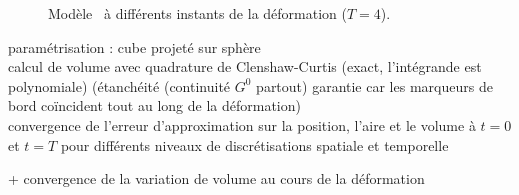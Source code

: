 \begin{figure}
	\centering
	
	\caption{Modèle \brep\ à différents instants de la déformation ($T=4$).}
	\label{fig:snapshots_vortex}
\end{figure}
paramétrisation : cube projeté sur sphère\\
calcul de volume avec quadrature de Clenshaw-Curtis (exact, l'intégrande est polynomiale) (étanchéité (continuité $G^0$ partout) garantie car les marqueurs de bord coïncident tout au long de la déformation)\\
convergence de l'erreur d'approximation sur la position, l'aire et le volume à $t = 0$ et $t = T$ pour différents niveaux de discrétisations spatiale et temporelle\\

\def\axw{0.48\textwidth}
\def\axh{0.39\textwidth}
\def\xlabl{$N$}%
\def\ylabl{Erreur}
\def\xsep{2pt}

+ convergence de la variation de volume au cours de la déformation\\


